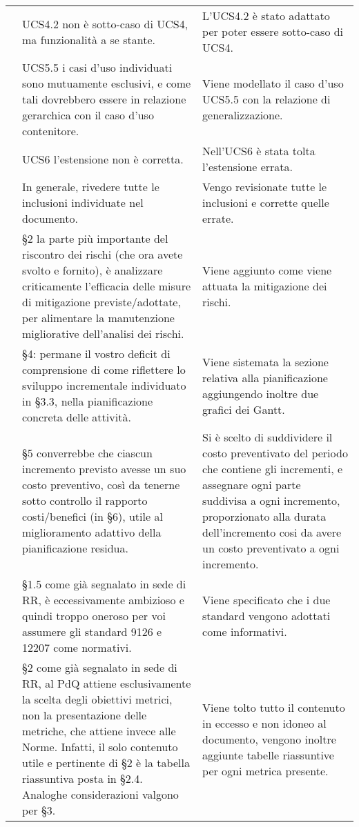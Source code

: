 {\begin{longtable}{ C{2.2cm} C{6cm} C{6cm}}
		\AdR & UCS4.2 non è sotto-caso di UCS4, ma funzionalità a se stante. & L'UCS4.2 è stato adattato per poter essere sotto-caso di UCS4.\\
		
		\AdR & UCS5.5 i casi d’uso individuati sono mutuamente esclusivi, e come tali dovrebbero essere in relazione gerarchica con il caso d’uso contenitore. & Viene modellato il caso d'uso UCS5.5 con la relazione di generalizzazione.\\
		
		\AdR & UCS6 l’estensione non è corretta. & Nell'UCS6 è stata tolta l'estensione errata.\\
		
		\AdR & In generale, rivedere tutte le inclusioni individuate nel documento.& Vengo revisionate tutte le inclusioni e corrette quelle errate.\\
		
		\PdP & §2 la parte più importante del riscontro dei rischi (che ora avete svolto e fornito), è analizzare criticamente l’efficacia delle misure di mitigazione previste/adottate, per alimentare la manutenzione migliorative dell’analisi dei rischi. & Viene aggiunto come viene attuata la mitigazione dei rischi. \\
		
		\PdP & §4: permane il vostro deficit di comprensione di come riflettere lo
		sviluppo incrementale individuato in §3.3, nella pianificazione concreta delle
		attività. & Viene sistemata la sezione relativa alla pianificazione aggiungendo inoltre due grafici dei Gantt.\\
		
		\PdP & §5 converrebbe che ciascun incremento previsto avesse un suo costo preventivo, così da tenerne sotto controllo il rapporto costi/benefici (in §6), utile al miglioramento adattivo della pianificazione residua. & Si è scelto di suddividere il costo preventivato del periodo che contiene gli incrementi, e assegnare ogni parte suddivisa a ogni incremento, proporzionato alla durata dell'incremento cosi da avere un costo preventivato a ogni incremento. \\
		
		\PdQ & §1.5 come già segnalato in sede di RR, è eccessivamente ambizioso e quindi troppo oneroso per voi assumere gli standard 9126 e 12207 come normativi. & Viene specificato che i due standard vengono adottati come informativi.\\
		
		\PdQ & §2 come già segnalato in sede di RR, al PdQ attiene esclusivamente la
		scelta degli obiettivi metrici, non la presentazione delle metriche, che attiene invece alle Norme. Infatti, il solo contenuto utile e pertinente di §2 è la tabella riassuntiva posta in §2.4. Analoghe considerazioni valgono per §3. & Viene tolto tutto il contenuto in eccesso e non idoneo al documento, vengono inoltre aggiunte tabelle riassuntive per ogni metrica presente.\\
		

\end{longtable}}
